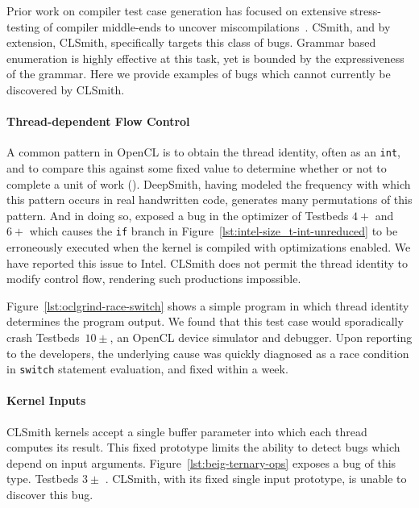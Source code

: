 Prior work on compiler test case generation has focused on extensive stress-testing of compiler middle-ends to uncover miscompilations~\cite{Chen2014a}. CSmith, and by extension, CLSmith, specifically targets this class of bugs. Grammar based enumeration is highly effective at this task, yet is bounded by the expressiveness of the grammar. Here we provide examples of bugs which cannot currently be discovered by CLSmith.

\paragraph{Thread-dependent Flow Control} A common pattern in OpenCL is to obtain the thread identity, often as an \texttt{int}, and to compare this against some fixed value to determine whether or not to complete a unit of work (). DeepSmith, having modeled the frequency with which this pattern occurs in real handwritten code, generates many permutations of this pattern. And in doing so, exposed a bug in the optimizer of Testbeds $4+$ and $6+$ which causes the \texttt{if} branch in Figure~\ref{lst:intel-size_t-int-unreduced} to be erroneously executed when the kernel is compiled with optimizations enabled. We have reported this issue to Intel. CLSmith does not permit the thread identity to modify control flow, rendering such productions impossible.

Figure~\ref{lst:oclgrind-race-switch} shows a simple program in which thread identity determines the program output. We found that this test case would sporadically crash Testbeds~$10\pm$, an OpenCL device simulator and debugger. Upon reporting to the developers, the underlying cause was quickly diagnosed as a race condition in \texttt{switch} statement evaluation, and fixed within a week.

\paragraph{Kernel Inputs} CLSmith kernels accept a single buffer parameter into which each thread computes its result. This fixed prototype limits the ability to detect bugs which depend on input arguments. Figure~\ref{lst:beig-ternary-ops} exposes a bug of this type. Testbeds $3\pm$ . CLSmith, with its fixed single input prototype, is unable to discover this bug. %

